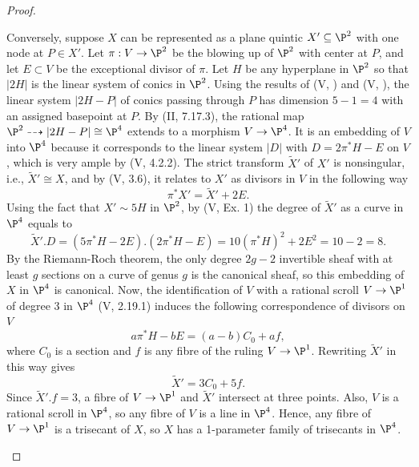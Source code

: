 \documentclass[a4paper]{article}
\begin{document}
\begin{enumerate} [label=\textbf{\arabic*.}, leftmargin=0em]
\begin{proof}
\begin{itemize} [leftmargin=0cm]
                  Conversely, suppose $X$ can be represented as a plane quintic $X' \subseteq \P^2$ with one node at $P \in X'$.
                  Let $\pi : V \to \P^2$ be the blowing up of $\P^2$ with center at $P$, and let $E \subset V$ be the exceptional divisor of $\pi$.
                  Let $H$ be any hyperplane in $\P^2$ so that $|2H|$ is the linear system of conics in $\P^2$.
                  Using the results of (V, ) and (V, ), the linear system $|2H - P|$ of conics passing through $P$ has dimension $5 - 1 = 4$ with an assigned basepoint at $P$.
                  By (II, 7.17.3), the rational map $\P^2 \dashrightarrow |2H - P| \cong \P^4$ extends to a morphism $V \to \P^4$.
                  It is an embedding of $V$ into $\P^4$ because it corresponds to the linear system $|D|$ with $D = 2\pi^*H - E$ on $V$, which is very ample by (V, 4.2.2).
                  The strict transform $\tilde{X}'$ of $X'$ is nonsingular, i.e., $\tilde{X}' \cong X$, and by (V, 3.6), it relates to $X'$ as divisors in $V$ in the following way
                  \begin{equation*}
                    \pi^*X' = \tilde{X}' + 2E.
                  \end{equation*}
                  Using the fact that $X' \sim 5H$ in $\P^2$, by (V, Ex. 1) the degree of $\tilde{X}'$ as a curve in $\P^4$ equals to
                  \begin{equation*}
                    \tilde{X}'.D = (5\pi^*H - 2E).(2\pi^*H - E) = 10 (\pi^*H)^2 + 2E^2 = 10 - 2 = 8.
                  \end{equation*}
                  By the Riemann-Roch theorem, the only degree $2g - 2$ invertible sheaf with at least $g$ sections on a curve of genus $g$ is the canonical sheaf, so this embedding of $X$ in $\P^4$ is canonical.
                  Now, the identification of $V$ with a rational scroll $V \to \P^1$ of degree 3 in $\P^4$ (V, 2.19.1) induces the following correspondence of divisors on $V$
                  \begin{equation*}
                    a\pi^* H - bE = (a - b) C_0 + a f,
                  \end{equation*}
                  where $C_0$ is a section and $f$ is any fibre of the ruling $V \to \P^1$.
                  Rewriting $\tilde{X}'$ in this way gives
                  \begin{equation*}
                    \tilde{X}' = 3C_0 + 5f.
                  \end{equation*}
                  Since $\tilde{X}'.f = 3$, a fibre of $V \to \P^1$ and $\tilde{X}'$ intersect at three points.
                  Also, $V$ is a rational scroll in $\P^4$, so any fibre of $V$ is a line in $\P^4$.
                  Hence, any fibre of $V \to \P^1$ is a trisecant of $X$, so $X$ has a 1-parameter family of trisecants in $\P^4$.


\end{itemize}
\end{proof}
\end{enumerate}
\end{document}
